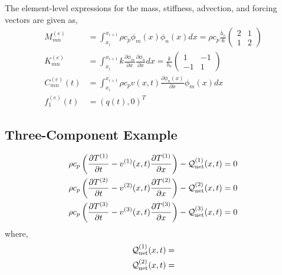 The element-level expressions for the mass, stiffness, advection, and forcing vectors are given as,
\begin{align}
    M^{(e)}_{mn} &= \int_{x_i}^{x_{i+1}}\rho c_p\phi_m(x)\phi_n(x)dx = \rho c_p \frac{h_e}{6}\begin{pmatrix}
        2 & 1 \\ 1 & 2
    \end{pmatrix}\\
    K^{(e)}_{mn} &= \int_{x_i}^{x_{i+1}} k \frac{\partial \phi_m}{\partial x}\frac{\partial \phi_n}{\partial x} dx = \frac{k}{h_e}\begin{pmatrix}
        1 & -1 \\ -1 & 1
    \end{pmatrix}\\
    C^{(e)}_{mn}(t) &= \int_{x_i}^{x_{i+1}}\rho c_p v(x,t) \frac{\partial \phi_n(x)}{\partial x}\phi_m(x) dx\\
    f^{(e)}_1(t) &= \left(q(t),0\right)^T
\end{align}

\subsection{Three-Component Example}

\begin{subequations}
    \begin{align}
        \rho c_p \left(\frac{\partial T^{(1)}}{\partial t} - v^{(1)}(x,t)\frac{\partial T^{(1)}}{\partial x}\right) - \mathcal{Q}^{(1)}_{\text{net}}(x,t) &= 0\\
        \rho c_p \left(\frac{\partial T^{(2)}}{\partial t} - v^{(2)}(x,t)\frac{\partial T^{(2)}}{\partial x}\right) - \mathcal{Q}^{(2)}_{\text{net}}(x,t) &= 0\\
        \rho c_p \left(\frac{\partial T^{(3)}}{\partial t} - v^{(3)}(x,t)\frac{\partial T^{(3)}}{\partial x}\right) - \mathcal{Q}^{(3)}_{\text{net}}(x,t) &= 0\\
    \end{align}
\end{subequations}
where,
\begin{subequations}
    \begin{align}
        \mathcal{Q}^{(1)}_{\text{net}}(x,t) &=\\
        \mathcal{Q}^{(2)}_{\text{net}}(x,t) &=\\
    \end{align}
\end{subequations}